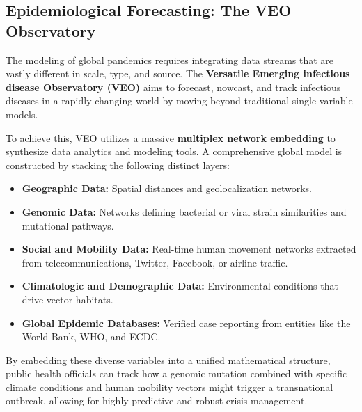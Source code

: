 \subsection{Epidemiological Forecasting: The VEO Observatory}
\label{subsec:veo_observatory}

The modeling of global pandemics requires integrating data streams that are vastly different in scale, type, and source. The \textbf{Versatile Emerging infectious disease Observatory (VEO)} aims to forecast, nowcast, and track infectious diseases in a rapidly changing world by moving beyond traditional single-variable models.


To achieve this, VEO utilizes a massive \textbf{multiplex network embedding} to synthesize data analytics and modeling tools. A comprehensive global model is constructed by stacking the following distinct layers:
\begin{itemize}
    \item \textbf{Geographic Data:} Spatial distances and geolocalization networks.
    \item \textbf{Genomic Data:} Networks defining bacterial or viral strain similarities and mutational pathways.
    \item \textbf{Social and Mobility Data:} Real-time human movement networks extracted from telecommunications, Twitter, Facebook, or airline traffic.
    \item \textbf{Climatologic and Demographic Data:} Environmental conditions that drive vector habitats.
    \item \textbf{Global Epidemic Databases:} Verified case reporting from entities like the World Bank, WHO, and ECDC.
\end{itemize}


By embedding these diverse variables into a unified mathematical structure, public health officials can track how a genomic mutation combined with specific climate conditions and human mobility vectors might trigger a transnational outbreak, allowing for highly predictive and robust crisis management.

